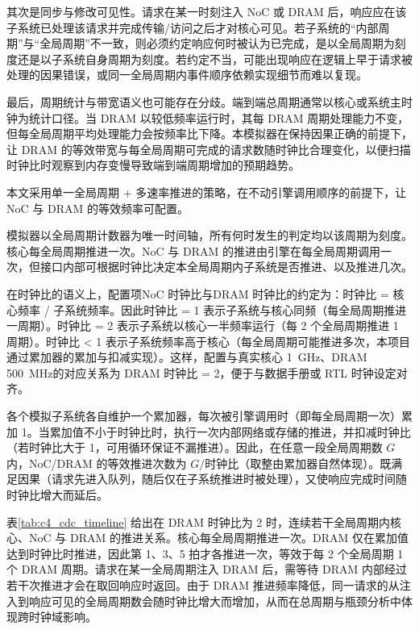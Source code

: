 其次是同步与修改可见性。请求在某一时刻注入 NoC 或 DRAM 后，响应应在该子系统已处理该请求并完成传输/访问之后才对核心可见。若子系统的“内部周期”与“全局周期”不一致，则必须约定响应何时被认为已完成，是以全局周期为刻度还是以子系统自身周期为刻度。若约定不当，可能出现响应在逻辑上早于请求被处理的因果错误，或同一全局周期内事件顺序依赖实现细节而难以复现。

最后，周期统计与带宽语义也可能存在分歧。端到端总周期通常以核心或系统主时钟为统计口径。当 DRAM 以较低频率运行时，其每 DRAM 周期处理能力不变，但每全局周期平均处理能力会按频率比下降。本模拟器在保持因果正确的前提下，让 DRAM 的等效带宽与每全局周期可完成的请求数随时钟比合理变化，以便扫描时钟比时观察到内存变慢导致端到端周期增加的预期趋势。


本文采用单一全局周期 + 多速率推进的策略，在不动引擎调用顺序的前提下，让 NoC 与 DRAM 的等效频率可配置。

模拟器以全局周期计数器为唯一时间轴，所有何时发生的判定均以该周期为刻度。核心每全局周期推进一次。NoC 与 DRAM 的推进由引擎在每全局周期调用一次，但接口内部可根据时钟比决定本全局周期内子系统是否推进、以及推进几次。

在时钟比的语义上，配置项NoC 时钟比与DRAM 时钟比的约定为：时钟比 = 核心频率 / 子系统频率。因此时钟比 = 1 表示子系统与核心同频（每全局周期推进一周期）。时钟比 = 2 表示子系统以核心一半频率运行（每 2 个全局周期推进 1 周期）。时钟比 < 1 表示子系统频率高于核心（每全局周期可能推进多次，本项目通过累加器的累加与扣减实现）。这样，配置与真实核心 \SI{1}{GHz}、DRAM \SI{500}{MHz}的对应关系为 DRAM 时钟比 = 2，便于与数据手册或 RTL 时钟设定对齐。

各个模拟子系统各自维护一个累加器，每次被引擎调用时（即每全局周期一次）累加 1。当累加值不小于时钟比时，执行一次内部网络或存储的推进，并扣减时钟比（若时钟比大于 1，可用循环保证不漏推进）。因此，在任意一段全局周期数 $G$ 内，NoC/DRAM 的等效推进次数为 $G/\text{时钟比}$（取整由累加器自然体现）。既满足因果（请求先进入队列，随后仅在子系统推进时被处理），又使响应完成时间随时钟比增大而延后。


表\ref{tab:c4_cdc_timeline} 给出在 DRAM 时钟比为 2 时，连续若干全局周期内核心、NoC 与 DRAM 的推进关系。核心每全局周期推进一次。DRAM 仅在累加值达到时钟比时推进，因此第 1、3、5 拍才各推进一次，等效于每 2 个全局周期 1 个 DRAM 周期。请求在某一全局周期注入 DRAM 后，需等待 DRAM 内部经过若干次推进才会在取回响应时返回。由于 DRAM 推进频率降低，同一请求的从注入到响应可见的全局周期数会随时钟比增大而增加，从而在总周期与瓶颈分析中体现跨时钟域影响。

